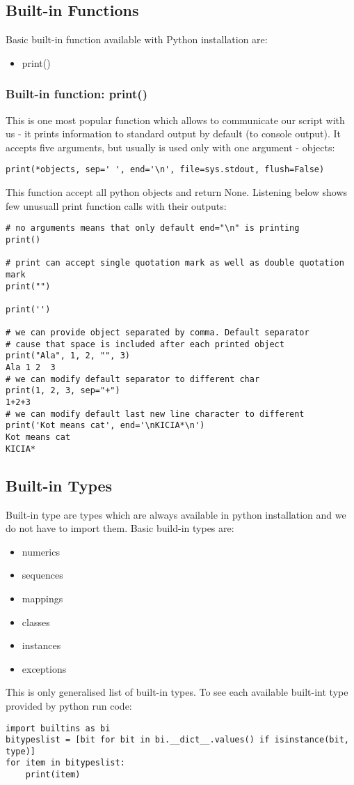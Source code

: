 \documentclass{article}
\begin{document}
	\newpage
	\subsection{Built-in Functions}
	Basic built-in function available with Python installation are:
	\begin{itemize}
	\item print()
	\end{itemize}
	\subsubsection{Built-in function: print()}
	This is one most popular function which allows to communicate our script with us - it prints information to standard output by default (to console output). It accepts five arguments, but usually is used only with one argument - objects:
	\begin{lstlisting}[style=pystyle]
print(*objects, sep=' ', end='\n', file=sys.stdout, flush=False)
	\end{lstlisting}
	This function accept all python objects and return None.
	Listening below shows few unusuall print function calls with their outputs:
	\begin{lstlisting}[style=pystyle]
# no arguments means that only default end="\n" is printing
print()

# print can accept single quotation mark as well as double quotation mark
print("")

print('')

# we can provide object separated by comma. Default separator
# cause that space is included after each printed object
print("Ala", 1, 2, "", 3)
Ala 1 2  3
# we can modify default separator to different char
print(1, 2, 3, sep="+")
1+2+3
# we can modify default last new line character to different 
print('Kot means cat', end='\nKICIA*\n')
Kot means cat
KICIA*
	\end{lstlisting}
	
	\newpage
	\subsection{Built-in Types}
	Built-in type are types which are always available in python installation and we do not have to import them. Basic build-in types are:
	\begin{itemize}
	\item numerics
	\item sequences
	\item mappings
	\item classes
	\item instances
	\item exceptions
	\end{itemize}
	This is only generalised list of built-in types. To see each available built-int type provided by python run code:
	\begin{lstlisting}[style=pystyle]
import builtins as bi
bitypeslist = [bit for bit in bi.__dict__.values() if isinstance(bit, type)]
for item in bitypeslist:
    print(item)
	\end{lstlisting}
	
\end{document}
